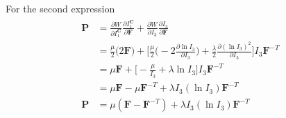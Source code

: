 \documentclass[12pt,3p]{article}
\numberwithin{equation}{section}
\begin{document}
For the second expression
\begin{align}
\begin{split}
\mathbf{P} &= \frac{\partial W}{\partial I_1^\mathbf{C}} \frac{\partial I_1^\mathbf{C}}{\partial \mathbf{F}} + \frac{\partial W}{\partial I_3} \frac{\partial I_3}{\partial \mathbf{F}} \\
		&= \frac{\mu}{2} \big( 2 \mathbf{F} \big) + \bigg[ \frac{\mu}{2} \big( -2 \frac{\partial \ln I_3}{\partial I_3}\big) + \frac{\lambda}{2} \frac{\partial (\ln I_3 )^2}{\partial I_3}\bigg] I_3 \mathbf{F}^{-T} \\
		&= \mu \mathbf{F} + \bigg[ - \frac{\mu}{I_3} + \lambda \ln I_3  \bigg] I_3 \mathbf{F}^{-T} \\
		&=  \mu \mathbf{F} - \mu \mathbf{F}^{-T} + \lambda I_3 (\ln I_3 ) \mathbf{F}^{-T} \\
\mathbf{P} &= \mu ( \mathbf{F} - \mathbf{F}^{-T}) + \lambda I_3 (\ln I_3) \mathbf{F}^{-T} 
\end{split}
\end{align}

\end{document}
